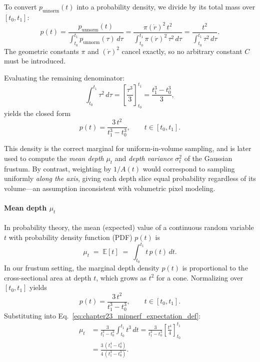\begin{enrichment}
\begin{enrichment}
    To convert $p_{\text{unnorm}}(t)$ into a probability density, we divide by its total mass over $[t_0,t_1]$:
    \[
    p(t) = \frac{p_{\text{unnorm}}(t)}{\displaystyle\int_{t_0}^{t_1} p_{\text{unnorm}}(\tau)\,d\tau}
    = \frac{\pi(\dot r)^2\,t^2}{\displaystyle\int_{t_0}^{t_1} \pi(\dot r)^2\,\tau^2\,d\tau}
    = \frac{t^2}{\displaystyle\int_{t_0}^{t_1} \tau^2\,d\tau}.
    \]
    The geometric constants $\pi$ and $(\dot r)^2$ cancel exactly, so no arbitrary constant $C$ must be introduced.
    
    Evaluating the remaining denominator:
    \[
    \int_{t_0}^{t_1} \tau^2\,d\tau
    = \left[ \frac{\tau^3}{3} \right]_{t_0}^{t_1}
    = \frac{t_1^3 - t_0^3}{3},
    \]
    yields the closed form
    \[
    p(t) = \frac{3\,t^2}{t_1^3 - t_0^3}, \qquad t \in [t_0, t_1].
    \]
    
    This density is the correct marginal for uniform-in-volume sampling, and is later used to compute the \emph{mean depth} $\mu_t$ and \emph{depth variance} $\sigma_t^2$ of the Gaussian frustum.  
    By contrast, weighting by $1/A(t)$ would correspond to sampling uniformly \emph{along the axis}, giving each depth slice equal probability regardless of its volume—an assumption inconsistent with volumetric pixel modeling.
    
    \paragraph{Mean depth $\mu_t$}  
    In probability theory, the mean (expected) value of a continuous random variable $t$ with probability density function (PDF) $p(t)$ is
    \begin{equation}
        \mu_t \;=\; \mathbb{E}[t]
        \;=\; \int_{t_0}^{t_1} t \, p(t) \, dt.
        \label{eq:chapter23_mipnerf_expectation_def}
    \end{equation}
    In our frustum setting, the marginal depth density $p(t)$ is proportional to the cross-sectional area at depth $t$, which grows as $t^2$ for a cone.  
    Normalizing over $[t_0, t_1]$ yields
    \[
    p(t) = \frac{3\,t^2}{t_1^3 - t_0^3}, \qquad t \in [t_0, t_1].
    \]
    Substituting into Eq.~\ref{eq:chapter23_mipnerf_expectation_def}:
    \begin{align}
        \mu_t
        &= \frac{3}{t_1^3 - t_0^3} \int_{t_0}^{t_1} t^3 \, dt
        = \frac{3}{t_1^3 - t_0^3} \left[ \frac{t^4}{4} \right]_{t_0}^{t_1} \\
        &= \frac{3\,(t_1^4 - t_0^4)}{4\,(t_1^3 - t_0^3)}.
        \label{eq:chapter23_mipnerf_mu_t_exact}
    \end{align}
    

\end{enrichment}
\end{enrichment}
